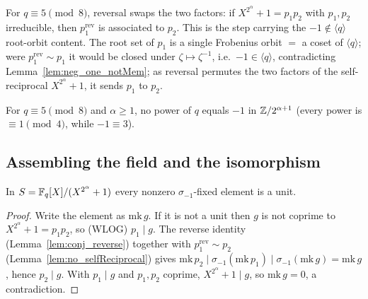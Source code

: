 \begin{lemma}\label{lem:no_selfReciprocal}
\leanok
{}
For $q \equiv 5 \pmod 8$, reversal swaps the two factors: if $X^{2^\alpha}+1 = p_1 p_2$ with
$p_1, p_2$ irreducible, then
$p_1^{\mathrm{rev}}$ is associated to $p_2$. This is the step carrying the
$-1 \notin \langle q\rangle$ root-orbit content. The root set of $p_1$ is a single Frobenius orbit $=$ a
coset of $\langle q\rangle$; were $p_1^{\mathrm{rev}} \sim p_1$ it would be closed under $\zeta
\mapsto \zeta^{-1}$, i.e.\ $-1 \in \langle q\rangle$, contradicting Lemma~\ref{lem:neg_one_notMem};
as reversal permutes the two factors of the self-reciprocal $X^{2^\alpha}+1$, it sends $p_1$ to $p_2$.
\end{lemma}

\begin{lemma}\label{lem:neg_one_notMem}
\leanok
For $q \equiv 5 \pmod 8$ and $\alpha \ge 1$, no power of $q$ equals $-1$ in $\mathbb{Z}/2^{\alpha+1}$ (every
power is $\equiv 1 \pmod 4$, while $-1 \equiv 3$).
\end{lemma}

\subsection{Assembling the field and the isomorphism}

\begin{theorem}\label{thm:core_unit}
\leanok
{}
In $S = \mathbb{F}_q[X]/(X^{2^\alpha}+1)$ every nonzero $\sigma_{-1}$-fixed element is a unit.
\end{theorem}

\begin{proof}
\leanok{}
Write the element as $\mathrm{mk}\,g$. If it is not a unit then $g$ is not coprime to
$X^{2^\alpha}+1 = p_1 p_2$, so (WLOG) $p_1 \mid g$. The reverse identity (Lemma~\ref{lem:conj_reverse})
together with $p_1^{\mathrm{rev}} \sim p_2$ (Lemma~\ref{lem:no_selfReciprocal}) gives
$\mathrm{mk}\,p_2 \mid \sigma_{-1}(\mathrm{mk}\,p_1) \mid \sigma_{-1}(\mathrm{mk}\,g) = \mathrm{mk}\,g$,
hence $p_2 \mid g$. With $p_1 \mid g$ and $p_1, p_2$ coprime, $X^{2^\alpha}+1 \mid g$, so
$\mathrm{mk}\,g = 0$, a contradiction.
\end{proof}

